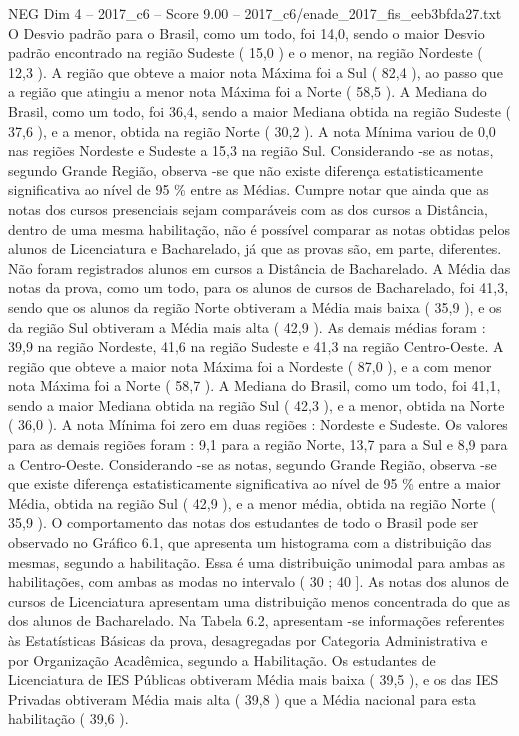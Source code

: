 \begin{textsample}{NEG Dim 4 – 2017\_c6 – Score 9.00 – 2017\_c6/enade\_2017\_fis\_eeb3bfda27.txt}
O Desvio padrão para o Brasil, como um todo, foi 14,0, sendo o maior Desvio padrão encontrado na região Sudeste ( 15,0 ) e o menor, na região Nordeste ( 12,3 ).
A região que obteve a maior nota Máxima foi a Sul ( 82,4 ), ao passo que a região que atingiu a menor nota Máxima foi a Norte ( 58,5 ).
A Mediana do Brasil, como um todo, foi 36,4, sendo a maior Mediana obtida na região Sudeste ( 37,6 ), e a menor, obtida na região Norte ( 30,2 ).
A nota Mínima variou de 0,0 nas regiões Nordeste e Sudeste a 15,3 na região Sul.
Considerando -se as notas, segundo Grande Região, observa -se que não existe diferença estatisticamente significativa ao nível de 95 \% entre as Médias.
Cumpre notar que ainda que as notas dos cursos presenciais sejam comparáveis com as dos cursos a Distância, dentro de uma mesma habilitação, não é possível comparar as notas obtidas pelos alunos de Licenciatura e Bacharelado, já que as provas são, em parte, diferentes.
Não foram registrados alunos em cursos a Distância de Bacharelado.
A Média das notas da prova, como um todo, para os alunos de cursos de Bacharelado, foi 41,3, sendo que os alunos da região Norte obtiveram a Média mais baixa ( 35,9 ), e os da região Sul obtiveram a Média mais alta ( 42,9 ).
As demais médias foram : 39,9 na região Nordeste, 41,6 na região Sudeste e 41,3 na região Centro-Oeste.
A região que obteve a maior nota Máxima foi a Nordeste ( 87,0 ), e a com menor nota Máxima foi a Norte ( 58,7 ).
A Mediana do Brasil, como um todo, foi 41,1, sendo a maior Mediana obtida na região Sul ( 42,3 ), e a menor, obtida na Norte ( 36,0 ).
A nota Mínima foi zero em duas regiões : Nordeste e Sudeste.
Os valores para as demais regiões foram : 9,1 para a região Norte, 13,7 para a Sul e 8,9 para a Centro-Oeste.
Considerando -se as notas, segundo Grande Região, observa -se que existe diferença estatisticamente significativa ao nível de 95 \% entre a maior Média, obtida na região Sul ( 42,9 ), e a menor média, obtida na região Norte ( 35,9 ).
O comportamento das notas dos estudantes de todo o Brasil pode ser observado no Gráfico 6.1, que apresenta um histograma com a distribuição das mesmas, segundo a habilitação.
Essa é uma distribuição unimodal para ambas as habilitações, com ambas as modas no intervalo ( 30 ; 40 ].
As notas dos alunos de cursos de Licenciatura apresentam uma distribuição menos concentrada do que as dos alunos de Bacharelado.
Na Tabela 6.2, apresentam -se informações referentes às Estatísticas Básicas da prova, desagregadas por Categoria Administrativa e por Organização Acadêmica, segundo a Habilitação.
Os estudantes de Licenciatura de IES Públicas obtiveram Média mais baixa ( 39,5 ), e os das IES Privadas obtiveram Média mais alta ( 39,8 ) que a Média nacional para esta habilitação ( 39,6 ).

\end{textsample}
